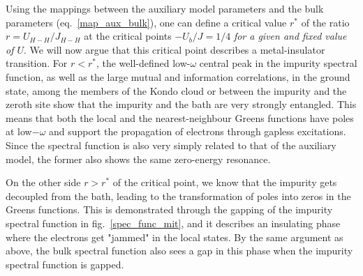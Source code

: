 \documentclass{report}
\numberwithin{equation}{section}
\begin{document}
\begin{itemize}
Using the mappings between the auxiliary model parameters and the bulk parameters (eq.~\ref{map_aux_bulk}), one can define a critical value \(r^{*}\) of the ratio \(r = U_{H-H}/J_{H-H}\) at the critical points \(-U_b/J=1/4\) \textit{for a given and fixed value of \(U\)}. We will now argue that this critical point describes a metal-insulator transition. For \(r < r^{*}\), the well-defined low-\(\omega\) central peak in the impurity spectral function, as well as the large mutual and information correlations, in the ground state, among the members of the Kondo cloud or between the impurity and the zeroth site show that the impurity and the bath are very strongly entangled. This means that both the local and the nearest-neighbour Greens functions have poles at low\(-\omega\) and support the propagation of electrons through gapless excitations. Since the spectral function is also very simply related to that of the auxiliary model, the former also shows the same zero-energy resonance. 

On the other side \(r > r^{*}\) of the critical point, we know that the impurity gets decoupled from the bath, leading to the transformation of poles into zeros in the Greens functions. This is demonstrated through the gapping of the impurity spectral function in fig.~\ref{spec_func_mit}, and it describes an insulating phase where the electrons get "jammed" in the local states. By the same argument as above, the bulk spectral function also sees a gap in this phase when the impurity spectral function is gapped.


\end{itemize}
\end{document}
